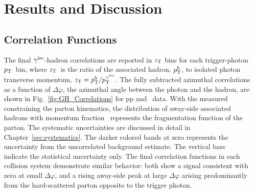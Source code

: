 







\chapter{Results and Discussion}

\section{Correlation Functions}
\label{sec:decaybkgsubtraction}
The final $ \gamma^\mathrm{iso}$-hadron correlations are reported in $z_{\mathrm{T}}$  bins for each trigger-photon $p_{\mathrm{T}}$~bin, where $z_{\mathrm{T}}$~is the ratio of the associated hadron, $p_{\mathrm{T}}^\mathrm{h}$, to isolated photon transverse momentum, $z_{\mathrm{T}} = p_{\mathrm{T}}^{\mathrm{h}}/p_{\mathrm{T}}^{\gamma^\mathrm{iso}}$. The fully subtracted azimuthal correlations as a function of $ \Delta\varphi$, the azimuthal angle between the photon and the hadron, are shown in Fig.~\ref{fig:GH_Correlations} for pp and \pPb~data. With the measured \gammaiso~ constraining the parton kinematics, the distribution of away-side associated hadrons with momentum fraction \zt~represents the fragmentation function of the parton. The systematic uncertainties are discussed in detail in Chapter~\ref{sec:systematics}. The darker colored bands at zero represents the uncertainty from the uncorrelated background estimate. The vertical bars indicate the statistical uncertainty only. The final correlation functions in each collision system demonstrate similar behavior: both show a signal consistent with zero at small $\Delta\varphi$, and a rising away-side peak at large $\Delta\varphi$ arising predominantly from the hard-scattered parton opposite to the trigger photon.


